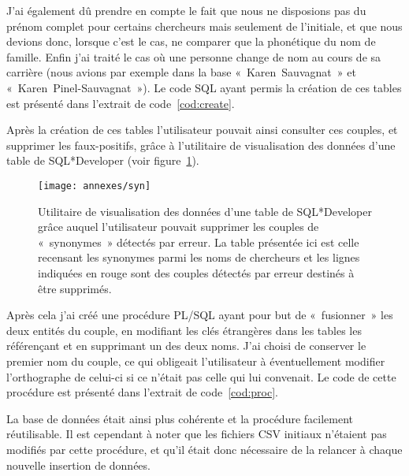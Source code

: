 			 J'ai également dû prendre en compte le fait que nous ne disposions pas du prénom complet pour certains chercheurs mais seulement de l'initiale, et que nous devions donc, lorsque c'est le cas, ne comparer que la phonétique du nom de famille. Enfin j'ai traité le cas où une personne change de nom au cours de sa carrière (nous avions par exemple dans la base «~Karen~Sauvagnat~» et «~Karen~Pinel-Sauvagnat~»). Le code SQL ayant permis la création de ces tables est présenté dans l'extrait de code~\ref{cod:create}.
			
			
			
			Après la création de ces tables l'utilisateur pouvait ainsi consulter ces couples, et supprimer les faux-positifs, grâce à l'utilitaire de visualisation des données d'une table de SQL*Developer (voir figure~\ref{fig:syn}).
			
			\begin{figure}
				\centering
				\texttt{[image: annexes/syn]}
				\caption{Utilitaire de visualisation des données d'une table de SQL*Developer grâce auquel l'utilisateur pouvait supprimer les couples de «~synonymes~» détectés par erreur. La table présentée ici est celle recensant les synonymes parmi les noms de chercheurs et les lignes indiquées en rouge sont des couples détectés par erreur destinés à être supprimés.}\label{fig:syn}
			\end{figure}
			
			 Après cela j'ai créé une procédure PL/SQL ayant pour but de «~fusionner~» les deux entités du couple, en modifiant les clés étrangères dans les tables les référençant et en supprimant un des deux noms. J'ai choisi de conserver le premier nom du couple, ce qui obligeait l'utilisateur à éventuellement modifier l'orthographe de celui-ci si ce n'était pas celle qui lui convenait. Le code de cette procédure est présenté dans l'extrait de code~\ref{cod:proc}.
			
			
			 
			 La base de données était ainsi plus cohérente et la procédure facilement réutilisable. Il est cependant à noter que les fichiers CSV initiaux n'étaient pas modifiés par cette procédure, et qu'il était donc nécessaire de la relancer à chaque nouvelle insertion de données.

